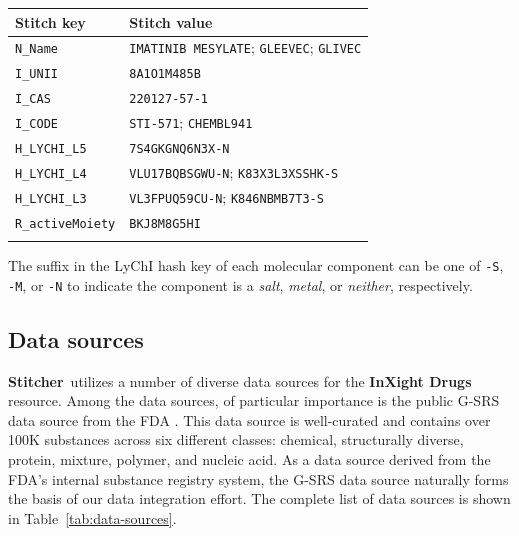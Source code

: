 \documentclass{bioinfo}
\newcommand\st{\textbf{Stitcher}}
\newcommand\ix{\textbf{InXight Drugs}}
\begin{document}
\begin{table}[thb]
{\begin{tabular}{@{}ll@{}}\toprule Stitch key &
Stitch value\\\midrule
\texttt{N\_Name} & \texttt{IMATINIB MESYLATE}; \texttt{GLEEVEC}; \texttt{GLIVEC}\\
\texttt{I\_UNII} & \texttt{8A1O1M485B}\\
\texttt{I\_CAS} & \texttt{220127-57-1}\\
\texttt{I\_CODE} & \texttt{STI-571}; \texttt{CHEMBL941}\\
\texttt{H\_LYCHI\_L5} & \texttt{7S4GKGNQ6N3X-N}\\
\texttt{H\_LYCHI\_L4} & \texttt{VLU17BQBSGWU-N}; \texttt{K83X3L3XSSHK-S}\\
\texttt{H\_LYCHI\_L3} & \texttt{VL3FPUQ59CU-N}; \texttt{K846NBMB7T3-S}\\
\texttt{R\_activeMoiety} & \texttt{BKJ8M8G5HI}\\\botrule
\end{tabular}}{The suffix in the LyChI hash key of each molecular component can be one of \texttt{-S}, \texttt{-M}, or \texttt{-N} to indicate the component is a \emph{salt}, \emph{metal}, or \emph{neither}, respectively.}
\end{table}

\subsection{Data sources}
\st\ utilizes a number of diverse data sources for the \ix{} resource. Among the data sources, of particular importance is the public G-SRS data source from the FDA \cite{GSRSData}. This data source is well-curated and contains over 100K substances across six different classes: chemical, structurally diverse, protein, mixture, polymer, and nucleic acid. As a data source derived from the FDA's internal substance registry system, the G-SRS data source naturally forms the basis of our data integration effort. The complete list of data sources is shown in Table~\ref{tab:data-sources}.
\end{document}
